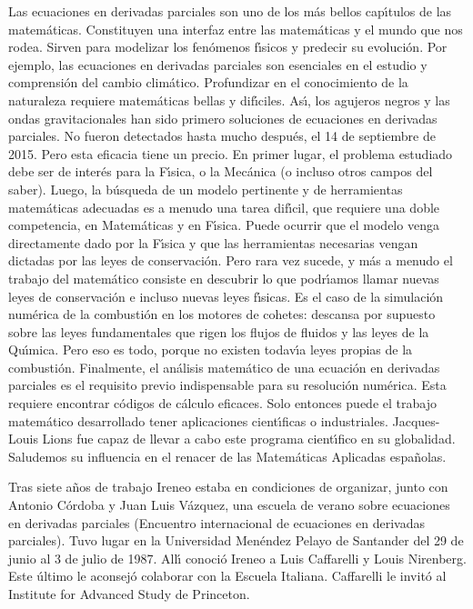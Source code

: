 Las ecuaciones en derivadas parciales son uno de los m\'as bellos cap{\'\i}tulos de las matem\'aticas. Constituyen una interfaz entre las matem\'aticas y el mundo que nos rodea. Sirven para modelizar los fen\'omenos f{\'\i}sicos y predecir su evoluci\'on. Por ejemplo, las ecuaciones en derivadas parciales son esenciales en el estudio y comprensi\'on del cambio clim\'atico. Profundizar en el conocimiento de la naturaleza requiere matem\'aticas bellas y dif{\'\i}ciles. As{\'\i}, los agujeros negros y las ondas gravitacionales han sido primero soluciones de ecuaciones en derivadas parciales. No  fueron   detectados hasta mucho despu\'es, el 14 de septiembre de 2015. Pero esta eficacia tiene un precio. En primer lugar, el problema estudiado debe ser de inter\'es para la F{\'\i}sica, o la Mec\'anica (o incluso otros campos del saber). Luego, la b\'usqueda de un modelo pertinente y de herramientas matem\'aticas adecuadas es a menudo una tarea dif{\'\i}cil, que requiere una doble competencia, en Matem\'aticas y en F{\'\i}sica. Puede ocurrir que el modelo venga directamente dado  por la F{\'\i}sica y que las herramientas necesarias vengan dictadas por las leyes de conservaci\'on. Pero rara vez sucede, y m\'as a menudo el trabajo del matem\'atico consiste en descubrir lo que podr{\'\i}amos llamar nuevas leyes de conservaci\'on e incluso nuevas leyes f{\'\i}sicas. Es el caso de la simulaci\'on num\'erica de la combusti\'on en los motores de cohetes: descansa por supuesto sobre las leyes fundamentales que rigen los flujos de fluidos y las leyes de la Qu{\'\i}mica. Pero eso es todo, porque no existen todav{\'\i}a leyes propias de la combusti\'on. Finalmente, el an\'alisis matem\'atico de una ecuaci\'on en derivadas parciales es el requisito previo indispensable para su resoluci\'on num\'erica. Esta 
 requiere encontrar c\'odigos de c\'alculo eficaces. Solo entonces puede el trabajo  matem\'atico desarrollado tener aplicaciones cient{\'\i}ficas o industriales. Jacques-Louis Lions fue capaz de llevar a cabo este programa cient{\'\i}fico en su globalidad. Saludemos su influencia en el renacer de las Matem\'aticas Aplicadas espa\~nolas.
 
 
 
Tras siete a\~nos de trabajo Ireneo estaba  en condiciones de organizar, junto con Antonio C\'ordoba y Juan Luis V\'azquez, una escuela de verano sobre ecuaciones en derivadas parciales (Encuentro internacional de ecuaciones en derivadas parciales). Tuvo lugar  en la Universidad Men\'endez Pelayo de Santander del 29 de junio al 3 de julio de 1987. All{\'\i} conoci\'o Ireneo a Luis Caffarelli y Louis Nirenberg. Este \'ultimo le aconsej\'o colaborar con la Escuela Italiana. Caffarelli le 
invit\'o al Institute for Advanced Study de Princeton.


